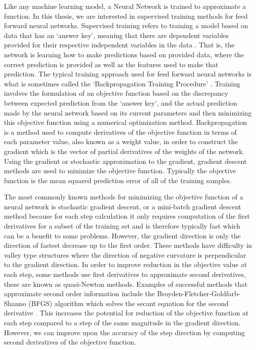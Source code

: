 \documentclass[letterpaper,12pt,titlepage,oneside,final]{book}
\begin{document}
	Like any machine learning model, a Neural Network is trained to approximate a function. In this thesis, we are interested in supervised training methods for feed forward neural networks. Supervised training refers to training a model based on data that has an `answer key', meaning that there are dependent variables provided for their respective independent variables in the data \cite{hastie2009overview}. That is, the network is learning how to make predictions based on provided data, where the correct prediction is provided as well as the features used to make that prediction. The typical training approach used for feed forward neural networks is what is sometimes called the `Backpropagation Training Procedure' \cite{priddy2005artificial}. Training involves the formulation of an objective function based on the discrepancy between expected prediction from the `answer key', and the actual prediction made by the neural network based on its current parameters and then minimizing this objective function using a numerical optimization method. Backpropagation is a method used to compute derivatives of the objective function in terms of each parameter value, also known as a weight value, in order to construct the gradient which is the vector of partial derivatives of the weights of the network. Using the gradient or stochastic approximation to the gradient, gradient descent methods are used to minimize the objective function. Typically the objective function is the mean squared prediction error of all of the training samples. 
	
	The most commonly known methods for minimizing the objective function of a neural network is stochastic gradient descent, or a mini-batch gradient descent method because for each step calculation it only requires computation of the first derivatives for a subset of the training set and is therefore typically fast which can be a benefit to some problems. However, the gradient direction is only the direction of fastest decrease up to the first order. These methods have difficulty in valley type structures where the direction of negative curvature is perpendicular to the gradient direction. In order to improve reduction in the objective value at each step, some methods use first derivatives to approximate second derivatives, these are known as quasi-Newton methods. Examples of successful methods that approximate second order information include the Broyden-Fletcher-Goldfarb-Shanno (BFGS) algorithm which solves the secant equation for the second derivative \cite{Shepherd.1997}. This increases the potential for reduction of the objective function at each step compared to a step of the same magnitude in the gradient direction. However, we can improve upon the accuracy of the step direction by computing second derivatives of the objective function.
	
\end{document}
